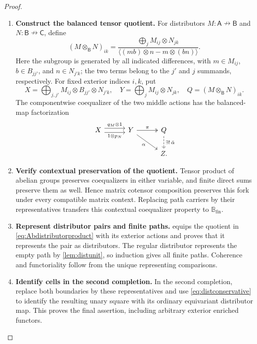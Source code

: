 \documentclass[11pt,reqno]{amsart}
\theoremstyle{plain}
\theoremstyle{definition}
\theoremstyle{remark}
\numberwithin{equation}{section}
\newcommand{\harr}{\mathrel{\nrightarrow}}
\begin{document}
\begin{proof}
\begin{enumerate}
\item \textbf{Construct the balanced tensor quotient.} For distributors $M:\mathsf A\harr\mathsf B$ and
$N:\mathsf B\harr\mathsf C$, define
\begin{equation}\label{eq:Abdistributorproduct}
 (M\otimes_{\mathsf B}N)_{ik}
 =\frac{\displaystyle\bigoplus_j M_{ij}\otimes N_{jk}}
 {\bigl\langle (mb)\otimes n-m\otimes(bn)\bigr\rangle}.
\end{equation}
Here the subgroup is generated by all indicated differences, with
$m\in M_{ij}$, $b\in B_{jj'}$, and $n\in N_{j'k}$; the two terms
belong to the $j'$ and $j$ summands, respectively. For fixed exterior indices $i,k$, put
\[
X=\bigoplus_{j,j'}M_{ij}\otimes B_{jj'}\otimes N_{j'k},\quad
Y=\bigoplus_j M_{ij}\otimes N_{jk},\quad
Q=(M\otimes_{\mathsf B}N)_{ik}.
\]
The componentwise coequalizer of the two middle actions has the
balanced-map factorization
\[
\begin{tikzcd}[column sep=3em]
X \arrow[r,shift left=.7ex,"q_M\otimes1"]
  \arrow[r,shift right=.7ex,"1\otimes p_N"'] &
Y \arrow[r,two heads,"\pi"] \arrow[dr,"\alpha"'] &
Q \arrow[d,dashed,"\exists!\,\bar\alpha"]\\
&& Z.
\end{tikzcd}
\]

\item \textbf{Verify contextual preservation of the quotient.} Tensor product of abelian groups preserves coequalizers in either variable, and finite
direct sums preserve them as well. Hence matrix cotensor composition
preserves this fork under every compatible matrix context. Replacing
path carriers by their representatives transfers this contextual
coequalizer property to $\mathbb B_{\mathrm{fin}}$.

\item \textbf{Represent distributor pairs and finite paths.}  equips the quotient in
\eqref{eq:Abdistributorproduct} with its exterior actions and proves
that it represents the pair as distributors. The regular distributor
represents the empty path by \cref{lem:distunit}, so induction gives
all finite paths. Coherence and functoriality follow from the unique
representing comparisons.

\item \textbf{Identify cells in the second completion.} In the second completion, replace both
boundaries by these representatives and use
\cref{eq:distconservative} to identify the resulting unary square
with its ordinary equivariant distributor map. This proves the final
assertion, including arbitrary exterior enriched functors.\qedhere
\end{enumerate}
\end{proof}
\end{document}
